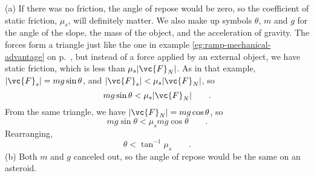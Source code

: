 (a) If there was no friction, the angle of repose would
be zero, so the coefficient of static friction, $\mu_s$,
will definitely matter. We also make up symbols $\theta$, $m$
and $g$ for the angle of the slope, the mass of the object,
and the acceleration of gravity. The forces form a triangle
just like the one in example \ref{eg:ramp-mechanical-advantage}
on p.~\pageref{eg:ramp-mechanical-advantage}, but instead of a force
applied by an external object, we have static friction,
which is less than $\mu_s |\vc{F}_N|$. As in that example,
$|\vc{F}_s|=mg \sin \theta$, and $|\vc{F}_s|<\mu_s |\vc{F}_N|$, so
\begin{equation*}
    mg \sin  \theta<\mu_s |\vc{F}_N| \qquad   .
\end{equation*}
From the same triangle, we have $|\vc{F}_N|=mg \cos\theta $, so
\begin{equation*}
    mg \sin  \theta<\mu_s mg \cos \theta  \qquad .
\end{equation*}
Rearranging,
\begin{equation*}
    \theta  < \tan^{-1} \mu_s   \qquad   .
\end{equation*}
(b) Both $m$ and $g$ canceled out, so the angle of repose
would be the same on an asteroid.
